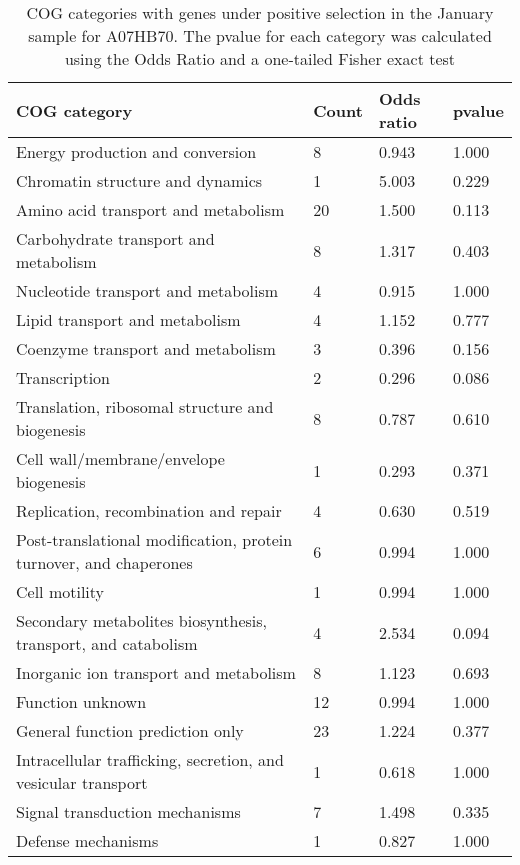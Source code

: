 \begin{table}[]
\footnotesize 
	\tabcolsep=0.11cm 
\caption{COG categories with genes under positive selection in the January sample for A07HB70. The pvalue for each category was calculated using the Odds Ratio and a one-tailed Fisher exact test} 
\begin{tabularx}{\textwidth}{L{6cm}R{2cm}R{2cm}R{2cm}} 
\hline 
\textbf{COG category} & \textbf{Count} & \textbf{Odds ratio} & \textbf{pvalue} \\ 
\hline 
Energy production and conversion & 8 & 0.943 & 1.000 \\ 
Chromatin structure and dynamics & 1 & 5.003 & 0.229 \\ 
Amino acid transport and metabolism & 20 & 1.500 & 0.113 \\ 
Carbohydrate transport and metabolism & 8 & 1.317 & 0.403 \\ 
Nucleotide transport and metabolism & 4 & 0.915 & 1.000 \\ 
Lipid transport and metabolism & 4 & 1.152 & 0.777 \\ 
Coenzyme transport and metabolism & 3 & 0.396 & 0.156 \\ 
Transcription & 2 & 0.296 & 0.086 \\ 
Translation, ribosomal structure and biogenesis & 8 & 0.787 & 0.610 \\ 
Cell wall/membrane/envelope biogenesis & 1 & 0.293 & 0.371 \\ 
Replication, recombination and repair & 4 & 0.630 & 0.519 \\ 
Post-translational modification, protein turnover, and chaperones & 6 & 0.994 & 1.000 \\ 
Cell motility & 1 & 0.994 & 1.000 \\ 
Secondary metabolites biosynthesis, transport, and catabolism & 4 & 2.534 & 0.094 \\ 
Inorganic ion transport and metabolism & 8 & 1.123 & 0.693 \\ 
Function unknown & 12 & 0.994 & 1.000 \\ 
General function prediction only & 23 & 1.224 & 0.377 \\ 
Intracellular trafficking, secretion, and vesicular transport & 1 & 0.618 & 1.000 \\ 
Signal transduction mechanisms & 7 & 1.498 & 0.335 \\ 
Defense mechanisms & 1 & 0.827 & 1.000 \\ 
\end{tabularx} 
\label{January_COG_Selection_A07HB70} 
 \end{table} 

